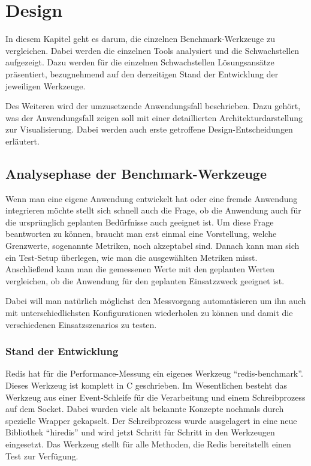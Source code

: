 \chapter{Design}
In diesem Kapitel geht es darum, die einzelnen Benchmark-Werkzeuge zu
vergleichen. Dabei werden die einzelnen Tools analysiert und die Schwachstellen
aufgezeigt. Dazu werden für die einzelnen Schwachstellen Lösungsansätze
präsentiert, bezugnehmend auf den derzeitigen Stand der Entwicklung der
jeweiligen Werkzeuge.

Des Weiteren wird der umzusetzende Anwendungsfall beschrieben. Dazu gehört, was
der Anwendungsfall zeigen soll mit einer detaillierten Architekturdarstellung
zur Visualisierung. Dabei werden auch erste getroffene Design-Entscheidungen
erläutert.

\section{Analysephase der Benchmark-Werkzeuge}
Wenn man eine eigene Anwendung entwickelt hat oder eine fremde Anwendung
integrieren möchte stellt sich schnell auch die Frage, ob die Anwendung auch für
die ursprünglich geplanten Bedürfnisse auch geeignet ist. Um diese Frage
beantworten zu können, braucht man erst einmal eine Vorstellung, welche
Grenzwerte, sogenannte Metriken, noch akzeptabel sind. Danach kann man sich ein
Test-Setup überlegen, wie man die ausgewählten Metriken misst. Anschließend kann
man die gemessenen Werte mit den geplanten Werten vergleichen, ob die Anwendung
für den geplanten Einsatzzweck geeignet ist.

Dabei will man natürlich möglichst den Messvorgang automatisieren um ihn auch
mit unterschiedlichsten Konfigurationen wiederholen zu können und damit die
verschiedenen Einsatzszenarios zu testen.

\subsection{Stand der Entwicklung}
Redis hat für die Performance-Messung ein eigenes Werkzeug
\enquote{redis-benchmark}. Dieses Werkzeug ist komplett in C geschrieben. Im
Wesentlichen besteht das Werkzeug aus einer Event-Schleife für die Verarbeitung
und einem Schreibprozess auf dem Socket. Dabei wurden viele alt bekannte
Konzepte nochmals durch spezielle Wrapper gekapselt. Der Schreibprozess wurde
ausgelagert in eine neue Bibliothek \enquote{hiredis} und wird jetzt Schritt für
Schritt in den Werkzeugen eingesetzt. Das Werkzeug stellt für alle Methoden,
die Redis bereitstellt einen Test zur Verfügung.

